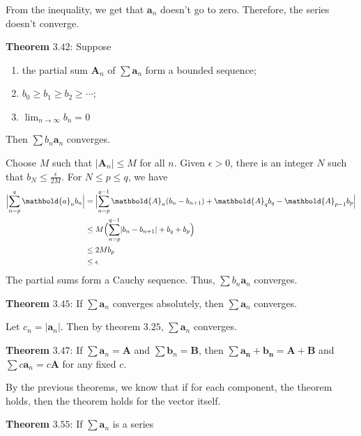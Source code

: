 \begin{enumerate}
\begin{enumerate}[label = (\alph*)]
    From the inequality, we get that \(\mathbold{a}_n\) doesn't go to zero.
    Therefore, the series doesn't converge.
  \end{enumerate}
  \textbf{Theorem} \(\mathbold{3.42}\): Suppose
  \begin{enumerate}[label = (\alph*)]
  \item
    the partial sum \(\mathbold{A}_n\) of \(\sum\mathbold{a}_n\) form a bounded
    sequence;
  \item
    \(b_0\geq b_1\geq b_2\geq\cdots\);
  \item
    \(\lim_{n\to\infty}b_n = 0\)
  \end{enumerate}
  Then \(\sum b_n\mathbold{a}_n\) converges.
  \par\smallskip
  Choose \(M\) such that \(\lvert\mathbold{A}_n\rvert\leq M\) for all \(n\).
  Given \(\epsilon > 0\), there is an integer \(N\) such that
  \(b_N\leq\frac{\epsilon}{2M}\).
  For \(N\leq p\leq q\), we have
  \begin{align*}
    \Bigl\lvert\sum_{n = p}^q\mathbold{a}_nb_n\Bigr\rvert
    & = \Bigl\lvert\sum_{n = p}^{q - 1}\mathbold{A}_n(b_n - b_{n + 1}) +
      \mathbold{A}_qb_q - \mathbold{A}_{p - 1}b_p\Bigr\rvert\\
    & \leq M\Bigl(\sum_{n = p}^{q - 1}\lvert b_n - b_{n + 1}\rvert + b_q +
      b_p\Bigr)\\
    & \leq 2Mb_p\\
    & \leq \epsilon
  \end{align*}
  The partial sums form a Cauchy sequence.
  Thus, \(\sum b_n\mathbold{a}_n\) converges.
  \par\smallskip
  \textbf{Theorem} \(\mathbold{3.45}\): If \(\sum\mathbold{a}_n\) converges
  absolutely, then \(\sum\mathbold{a}_n\) converges.
  \par\smallskip
  Let \(c_n = \lvert\mathbold{a}_n\rvert\).
  Then by theorem \(3.25\), \(\sum\mathbold{a}_n\) converges.
  \par\smallskip
  \textbf{Theorem} \(\mathbold{3.47}\): If
  \(\sum\mathbold{a}_n = \mathbold{A}\) and
  \(\sum\mathbold{b}_n = \mathbold{B}\), then
  \(\sum\mathbold{a_n + b_n} = \mathbold{A + B}\) and
  \(\sum c\mathbold{a}_n = c\mathbold{A}\) for any fixed \(c\).
  \par\smallskip
  By the previous theorems, we know that if for each component, the theorem
  holds, then the theorem holds for the vector itself.
  \par\smallskip
  \textbf{Theorem} \(\mathbold{3.55}\): If \(\sum\mathbold{a}_n\) is a series

\end{enumerate}
